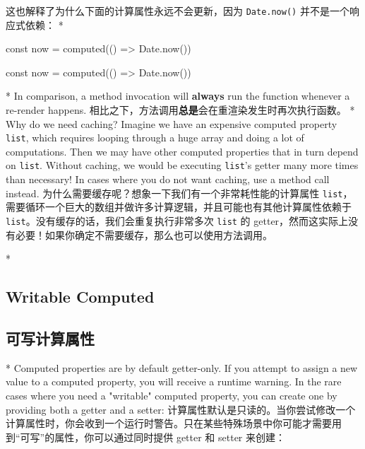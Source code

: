 \begin{paracol}{2}
\switchcolumn
这也解释了为什么下面的计算属性永远不会更新，因为 \texttt{Date.now()}
并不是一个响应式依赖：
\switchcolumn[0]*%
\begin{codeJs}
const now = computed(() => Date.now())
\end{codeJs}
\switchcolumn
\begin{codeJs}
const now = computed(() => Date.now())
\end{codeJs}
\switchcolumn[0]*%
In comparison, a method invocation will \textbf{always} run the function
whenever a re-render happens.
\switchcolumn
相比之下，方法调用\textbf{总是}会在重渲染发生时再次执行函数。
\switchcolumn[0]*%
Why do we need caching? Imagine we have an expensive computed property
\texttt{list}, which requires looping through a huge array and doing a
lot of computations. Then we may have other computed properties that in
turn depend on \texttt{list}. Without caching, we would be executing
\texttt{list}'s getter many more times than necessary! In cases where
you do not want caching, use a method call instead.
\switchcolumn
为什么需要缓存呢？想象一下我们有一个非常耗性能的计算属性
\texttt{list}，需要循环一个巨大的数组并做许多计算逻辑，并且可能也有其他计算属性依赖于
\texttt{list}。没有缓存的话，我们会重复执行非常多次 \texttt{list} 的
getter，然而这实际上没有必要！如果你确定不需要缓存，那么也可以使用方法调用。
\end{paracol}

\begin{paracol}{2}
\switchcolumn[0]*%
\subsection{Writable Computed}
\switchcolumn
\subsection{可写计算属性}
\switchcolumn[0]*%
Computed properties are by default getter-only. If you attempt to assign
a new value to a computed property, you will receive a runtime warning.
In the rare cases where you need a "writable" computed property, you can
create one by providing both a getter and a setter:
\switchcolumn
计算属性默认是只读的。当你尝试修改一个计算属性时，你会收到一个运行时警告。只在某些特殊场景中你可能才需要用到``可写''的属性，你可以通过同时提供
getter 和 setter 来创建：
\end{paracol}
 





